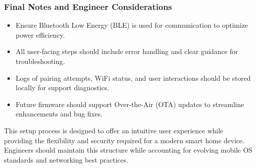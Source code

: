 \subsubsection{Final Notes and Engineer Considerations}

\begin{itemize}
    \item Ensure Bluetooth Low Energy (BLE) is used for communication to optimize power efficiency.
    \item All user-facing steps should include error handling and clear guidance for troubleshooting.
    \item Logs of pairing attempts, WiFi status, and user interactions should be stored locally for support diagnostics.
    \item Future firmware should support Over-the-Air (OTA) updates to streamline enhancements and bug fixes.
\end{itemize}

This setup process is designed to offer an intuitive user experience while providing the flexibility and security required for a modern smart home device. Engineers should maintain this structure while accounting for evolving mobile OS standards and networking best practices.
